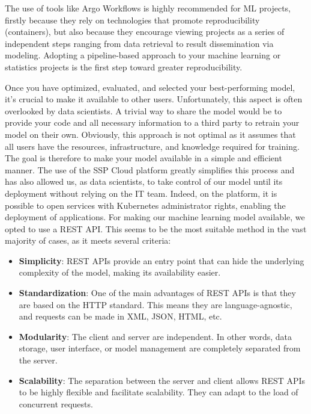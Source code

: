 The use of tools like Argo Workflows is highly recommended for ML projects, firstly because they rely on technologies that promote reproducibility (containers), but also because they encourage viewing projects as a series of independent steps ranging from data retrieval to result dissemination via modeling. Adopting a pipeline-based approach to your machine learning or statistics projects is the first step toward greater reproducibility.


Once you have optimized, evaluated, and selected your best-performing model, it's crucial to make it available to other users. Unfortunately, this aspect is often overlooked by data scientists. A trivial way to share the model would be to provide your code and all necessary information to a third party to retrain your model on their own. Obviously, this approach is not optimal as it assumes that all users have the resources, infrastructure, and knowledge required for training. The goal is therefore to make your model available in a simple and efficient manner. The use of the SSP Cloud platform greatly simplifies this process and has also allowed us, as data scientists, to take control of our model until its deployment without relying on the IT team. Indeed, on the platform, it is possible to open services with Kubernetes administrator rights, enabling the deployment of applications. For making our machine learning model available, we opted to use a REST API. This seems to be the most suitable method in the vast majority of cases, as it meets several criteria:

\begin{itemize}
    \item \textbf{Simplicity}: REST APIs provide an entry point that can hide the underlying complexity of the model, making its availability easier.
    \item \textbf{Standardization}: One of the main advantages of REST APIs is that they are based on the HTTP standard. This means they are language-agnostic, and requests can be made in XML, JSON, HTML, etc.
    \item \textbf{Modularity}: The client and server are independent. In other words, data storage, user interface, or model management are completely separated from the server.
    \item \textbf{Scalability}: The separation between the server and client allows REST APIs to be highly flexible and facilitate scalability. They can adapt to the load of concurrent requests.
\end{itemize}

